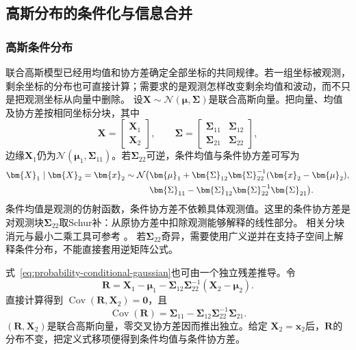 \subsection{高斯分布的条件化与信息合并}
\subsubsection{高斯条件分布}
联合高斯模型已经用均值和协方差确定全部坐标的共同规律。若一组坐标被观测，剩余坐标的分布也可直接计算；需要求的是观测怎样改变剩余均值和波动，而不只是把观测坐标从向量中删除。
设\(\bm X\sim\mathcal N(\bm\mu,\bm\Sigma)\)是联合高斯向量。把向量、均值及协方差按相同坐标分块，其中
\[
  \bm{X}=
  \begin{bmatrix}\bm{X}_1\\\bm{X}_2\end{bmatrix},
  \qquad
  \bm{\Sigma}=
  \begin{bmatrix}
    \bm{\Sigma}_{11}&\bm{\Sigma}_{12}\\
    \bm{\Sigma}_{21}&\bm{\Sigma}_{22}
  \end{bmatrix},
\]
边缘\(\bm{X}_1\)仍为\(\mathcal{N}(\bm{\mu}_1,\bm{\Sigma}_{11})\)。若\(\bm{\Sigma}_{22}\)可逆，条件均值与条件协方差可写为
\begin{align}
  \bm{X}_1\mid\bm{X}_2=\bm{x}_2
  \sim\mathcal{N}\bigl(
  &\bm{\mu}_1+
  \bm{\Sigma}_{12}\bm{\Sigma}_{22}^{-1}
  (\bm{x}_2-\bm{\mu}_2),\notag\\
  &\bm{\Sigma}_{11}
  -\bm{\Sigma}_{12}\bm{\Sigma}_{22}^{-1}
  \bm{\Sigma}_{21}
  \bigr).
  \label{eq:probability-conditional-gaussian}
\end{align}
条件均值是观测的仿射函数，条件协方差不依赖具体观测值。这里的条件协方差是对观测块\(\bm\Sigma_{22}\)取Schur补：从原协方差中扣除观测能够解释的线性部分。
相关分块消元与最小二乘工具可参考
。
若\(\bm\Sigma_{22}\)奇异，需要使用广义逆并在支持子空间上解释条件分布，不能直接套用逆矩阵公式。

式~\eqref{eq:probability-conditional-gaussian}也可由一个独立残差推导。令
\[
  \bm{R}
  =\bm{X}_1-\bm{\mu}_1
   -\bm{\Sigma}_{12}\bm{\Sigma}_{22}^{-1}
    (\bm{X}_2-\bm{\mu}_2).
\]
直接计算得到
\(\operatorname{Cov}(\bm{R},\bm{X}_2)=\bm{0}\)，且
\[
  \operatorname{Cov}(\bm{R})
  =\bm{\Sigma}_{11}
   -\bm{\Sigma}_{12}\bm{\Sigma}_{22}^{-1}\bm{\Sigma}_{21}.
\]
\((\bm{R},\bm{X}_2)\)是联合高斯向量，零交叉协方差因而推出独立。给定
\(\bm{X}_2=\bm{x}_2\)后，\(\bm{R}\)的分布不变，把定义式移项便得到条件均值与条件协方差。

